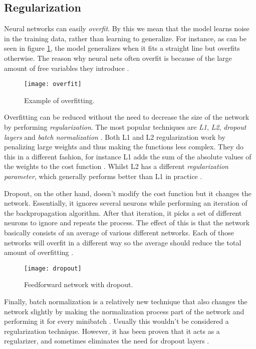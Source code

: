 \subsection{Regularization}

Neural networks can easily \textit{overfit}.
By this we mean that the model learns noise in the training data, rather than learning to generalize.
For instance, as can be seen in figure \ref{fig:overfit}, the model generalizes when it fits a straight line but overfits otherwise.
The reason why neural nets often overfit is because of the large amount of free variables they introduce \cite{nielsen_2017}.

\begin{figure}[ht]
  \centering
  \texttt{[image: overfit]}
  \caption{Example of overfitting.}
  \label{fig:overfit}
\end{figure}

Overfitting can be reduced without the need to decrease the size of the network by performing \textit{regularization}.
The most popular techniques are \textit{L1}, \textit{L2}, \textit{dropout layers} and \textit{batch normalization} \cite{nielsen_2017}.
Both L1 and L2 regularization work by penalizing large weights and thus making the functions less complex.
They do this in a different fashion, for instance L1 adds the sum of the absolute values of the weights to the cost function \cite{nielsen_2017}.
Whilst L2 has a different \textit{regularization parameter}, which generally performs better than L1 in practice \cite{nielsen_2017}.

Dropout, on the other hand, doesn't modify the cost function but it changes the network.
Essentially, it ignores several neurons while performing an iteration of the backpropagation algorithm.
After that iteration, it picks a set of different neurons to ignore and repeats the process.
The effect of this is that the network basically consists of an average of various different networks.
Each of those networks will overfit in a different way so the average should reduce the total amount of overfitting \cite{nielsen_2017}.

\begin{figure}[ht]
  \centering
  \texttt{[image: dropout]}
  \caption{Feedforward network with dropout.}
  \label{fig:dropout}
\end{figure}


Finally, batch normalization is a relatively new technique that also changes the network slightly by making the normalization process part of the network and performing it for every minibatch \cite{ioffe2015batch}.
Usually this wouldn't be considered a regularization technique.
However, it has been proven that it acts as a regularizer, and sometimes eliminates the need for dropout layers \cite{ioffe2015batch}.

